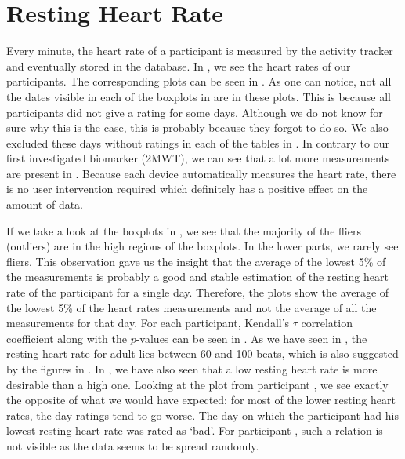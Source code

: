 
\section{Resting Heart Rate}
Every minute, the heart rate of a participant is measured by the activity tracker and eventually stored in the database. 
In , we see the heart rates of our participants.
The corresponding plots can be seen in .
As one can notice, not all the dates visible in each of the boxplots in  are in these plots. 
This is because all participants did not give a rating for some days.
Although we do not know for sure why this is the case, this is probably because they forgot to do so.
We also excluded these days without ratings in each of the tables in .
In contrary to our first investigated biomarker (2MWT), we can see that a lot more measurements are present in .
Because each device automatically measures the heart rate, there is no user intervention required which definitely has a positive effect on the amount of data.

If we take a look at the boxplots in , we see that the majority of the fliers (outliers) are in the high regions of the boxplots.
In the lower parts, we rarely see fliers.
This observation gave us the insight that the average of the lowest 5\% of the measurements is probably a good and stable estimation of the resting heart rate of the participant for a single day.
Therefore, the plots show the average of the lowest 5\% of the heart rates measurements and not the average of all the measurements for that day.
For each participant, Kendall's $\tau$ correlation coefficient along with the $p$-values can be seen in .
As we have seen in , the resting heart rate for adult lies between 60 and 100 beats, which is also suggested by the figures in .
In , we have also seen that a low resting heart rate is more desirable than a high one.
Looking at the plot from participant , we see exactly the opposite of what we would have expected: for most of the lower resting heart rates, the day ratings tend to go worse. 
The day on which the participant had his lowest resting heart rate was rated as `bad'.
For participant , such a relation is not visible as the data seems to be spread randomly.


